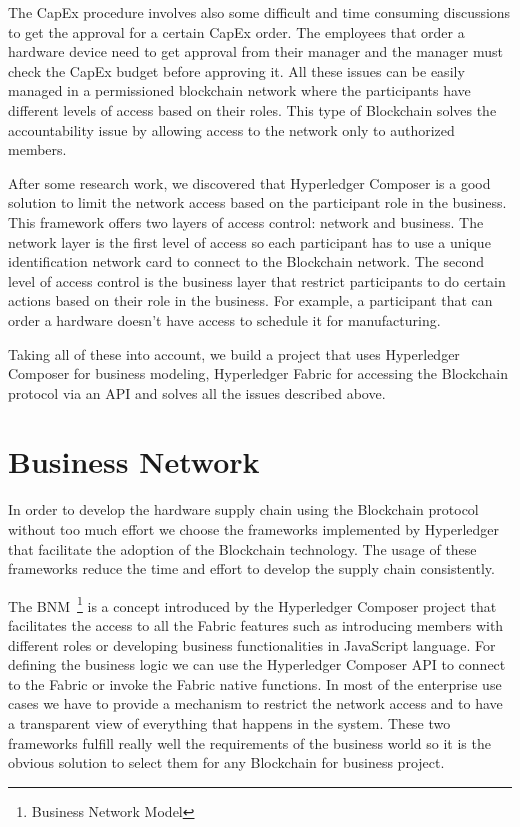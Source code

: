 The CapEx procedure involves also some difficult and time consuming discussions to get the approval for a certain CapEx order. The employees that order a hardware device need to get approval from their manager and the manager must check the CapEx budget before approving it. All these issues can be easily managed in a permissioned blockchain network where the participants have different levels of access based on their roles. This type of Blockchain solves the accountability issue by allowing access to the network only to authorized members. 

After some research work, we discovered that Hyperledger Composer is a good solution to limit the network access based on the participant role in the business. This framework offers two layers of access control: network and business. The network layer is the first level of access so each participant has to use a unique identification network card to connect to the Blockchain network. The second level of access control is the business layer that restrict participants to do certain actions based on their role in the business. For example, a participant that can order a hardware doesn't have access to schedule it for manufacturing.

Taking all of these into account, we build a project that uses Hyperledger Composer for business modeling, Hyperledger Fabric for accessing the Blockchain protocol via an API and solves all the issues described above.

\section{Business Network}
\label{sec:chapter3-section2}
In order to develop the hardware supply chain using the Blockchain protocol without too much effort we choose the frameworks implemented by Hyperledger that facilitate the adoption of the Blockchain technology. The usage of these frameworks reduce the time and effort to develop the supply chain consistently.

The BNM~\footnote{Business Network Model} is a concept introduced by the Hyperledger Composer project that facilitates the access to all the Fabric features such as introducing members with different roles or developing business functionalities in JavaScript language. For defining the business logic we can use the Hyperledger Composer API to connect to the Fabric or invoke the Fabric native functions. In most of the enterprise use cases we have to provide a mechanism to restrict the network access and to have a transparent view of everything that happens in the system. 
These two frameworks fulfill really well the requirements of the business world so
it is the obvious solution to select them for any Blockchain for business project.

